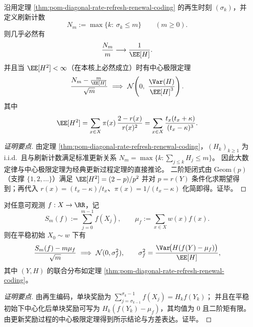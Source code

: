 \begin{theorem}\label{thm:pom-diagonal-rate-refresh-count-renewal-clt}
沿用定理 \ref{thm:pom-diagonal-rate-refresh-renewal-coding} 的再生时刻 \((\sigma_k)\)，并定义刷新计数
\[
N_m:=\max\{k:\ \sigma_k\le m\}\qquad(m\ge 0).
\]
则几乎必然有
\[
\frac{N_m}{m}\longrightarrow \frac{1}{\EE[H]}.
\]
并且当 \(\EE[H^2]<\infty\)（在本核上必然成立）时有中心极限定理
\[
\frac{N_m-\frac{m}{\EE[H]}}{\sqrt m}\ \Longrightarrow\ \mathcal N\!\left(0,\ \frac{\Var(H)}{\EE[H]^3}\right).
\]
其中
\[
\EE[H^2]=\sum_{x\in X}\pi(x)\,\frac{2-r(x)}{r(x)^2}
=\sum_{x\in X}\frac{t_x(t_x+\kappa)}{(t_x-\kappa)^3}.
\]
\end{theorem}
\begin{proof}[证明要点]
由定理 \ref{thm:pom-diagonal-rate-refresh-renewal-coding}，\((H_k)_{k\ge 1}\) 为 i.i.d.\ 且与刷新计数满足标准更新关系 \(N_m=\max\{k:\sum_{j\le k}H_j\le m\}\)。
因此大数定律与中心极限定理为经典更新过程定理的直接推论。
二阶矩闭式由 \(\mathrm{Geom}(p)\)（支撑 \(\{1,2,\dots\}\)）满足 \(\EE[H^2]=(2-p)/p^2\) 并对 \(p=r(Y)\) 条件化求期望得到；再代入 \(r(x)=(t_x-\kappa)/t_x\)、\(\pi(x)=1/(t_x-\kappa)\) 化简即得。证毕。
\end{proof}

\begin{theorem}\label{thm:pom-diagonal-rate-refresh-reward-clt}
对任意可观测 \(f:X\to\RR\)，记
\[
S_m(f):=\sum_{j=0}^{m-1}f(X_j),
\qquad
\mu_f:=\sum_{x\in X}w(x)f(x).
\]
则在平稳初始 \(X_0\sim w\) 下有
\[
\frac{S_m(f)-m\mu_f}{\sqrt m}\ \Longrightarrow\ \mathcal N(0,\sigma_f^2),
\qquad
\sigma_f^2=\frac{\Var\!\bigl(H(f(Y)-\mu_f)\bigr)}{\EE[H]},
\]
其中 \((Y,H)\) 的联合分布如定理 \ref{thm:pom-diagonal-rate-refresh-renewal-coding}。
\end{theorem}
\begin{proof}[证明要点]
由再生编码，单块奖励为 \(\sum_{j=\sigma_{k-1}}^{\sigma_k-1} f(X_j)=H_k f(Y_k)\)；
并且在平稳初始下中心化后单块奖励可写为
\(
H_k(f(Y_k)-\mu_f)
\)，其均值为 \(0\) 且二阶矩有限。
由更新奖励过程的中心极限定理得到所示结论与方差表达。证毕。
\end{proof}

